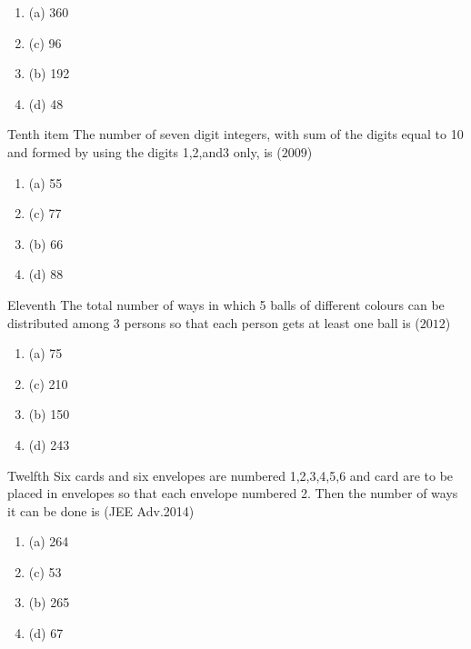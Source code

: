 \documentclass[journal,12pt,twocolumn]{IEEEtran}
\theoremstyle{remark}
\begin{document}
\begin{enumerate}[start=3]
{\begin{multicols}{2} 
\begin{enumerate}
[label=, left=0pt, labelsep=0pt, itemsep=1em]
\item (a) 360\item (c) 96\item(b) 192\item (d) 48
\end{enumerate}
\end{multicols}
\item Tenth item The number of seven digit integers, with sum of the digits equal to 10 and formed by using the digits 1,2,and3 only, is
\hfill{($2009$)}\\
\begin{multicols}{2} 
\begin{enumerate}
[label=, left=0pt, labelsep=0pt, itemsep=1em]
\item(a) 55\item(c) 77\item (b) 66\item(d) 88
\end{enumerate}
\end{multicols}
\item Eleventh The total number of ways in which 5 balls of different colours can be distributed among 3 persons so that each person gets at least one ball is
\hfill{($2012$)}\\
\begin{multicols}{2} 
\begin{enumerate}
[label=, left=0pt, labelsep=0pt, itemsep=1em]
\item (a) 75\item (c) 210\item(b) 150\item (d) 243
\end{enumerate}
\end{multicols}
\item Twelfth Six cards and six envelopes are numbered 1,2,3,4,5,6 and card are to be placed in envelopes so that each envelope numbered 2. Then the number of ways it can be done is
\hfill{(JEE Adv.2014)}\\
\begin{multicols}{2} 
\begin{enumerate}
[label=, left=0pt, labelsep=0pt, itemsep=1em]
\item (a) 264\item (c) 53\item(b) 265\item  (d) 67

\end{enumerate}
\end{multicols}}
\end{enumerate}
\end{document}
